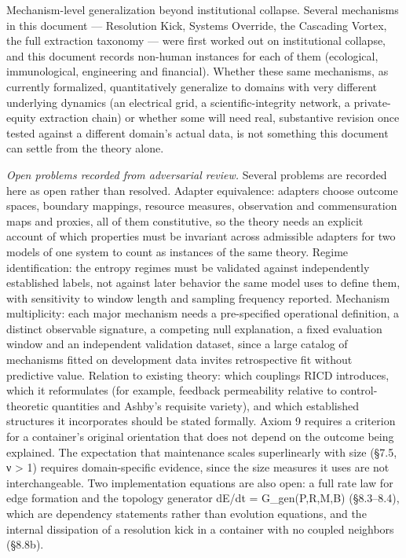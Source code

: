 \documentclass[
]{article}
\begin{document}
Mechanism-level generalization beyond institutional collapse. Several
mechanisms in this document --- Resolution Kick, Systems Override, the
Cascading Vortex, the full extraction taxonomy --- were first worked out
on institutional collapse, and this document records non-human instances
for each of them (ecological, immunological, engineering and financial).
Whether these same mechanisms, as currently formalized, quantitatively
generalize to domains with very different underlying dynamics (an
electrical grid, a scientific-integrity network, a private-equity
extraction chain) or whether some will need real, substantive revision
once tested against a different domain's actual data, is not something
this document can settle from the theory alone.

\emph{Open problems recorded from adversarial review.} Several problems
are recorded here as open rather than resolved. Adapter equivalence:
adapters choose outcome spaces, boundary mappings, resource measures,
observation and commensuration maps and proxies, all of them
constitutive, so the theory needs an explicit account of which
properties must be invariant across admissible adapters for two models
of one system to count as instances of the same theory. Regime
identification: the entropy regimes must be validated against
independently established labels, not against later behavior the same
model uses to define them, with sensitivity to window length and
sampling frequency reported. Mechanism multiplicity: each major
mechanism needs a pre-specified operational definition, a distinct
observable signature, a competing null explanation, a fixed evaluation
window and an independent validation dataset, since a large catalog of
mechanisms fitted on development data invites retrospective fit without
predictive value. Relation to existing theory: which couplings RICD
introduces, which it reformulates (for example, feedback permeability
relative to control-theoretic quantities and Ashby's requisite variety),
and which established structures it incorporates should be stated
formally. Axiom 9 requires a criterion for a container's original
orientation that does not depend on the outcome being explained. The
expectation that maintenance scales superlinearly with size (§7.5, ν
\textgreater{} 1) requires domain-specific evidence, since the size
measures it uses are not interchangeable. Two implementation equations
are also open: a full rate law for edge formation and the topology
generator dE/dt = G\_gen(P,R,M,B) (§8.3--8.4), which are dependency
statements rather than evolution equations, and the internal dissipation
of a resolution kick in a container with no coupled neighbors (§8.8b).
\end{document}
